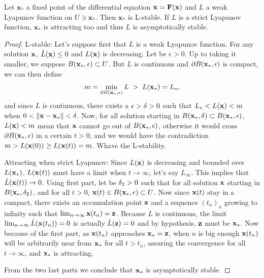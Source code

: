 \begin{theoreme} \label{th:Lyapunov}
Let $\mathbf{x}_*$ a fixed point of the differential equation $\dot{\mathbf{x}} = \mathbf{F}(\mathbf{x})$ and $L$ a weak Lyapunov function on $U\ni\mathbf{x}_*$. Then $\mathbf{x}_*$ is L-stable. If $L$ is a strict Lyapunov function, $\mathbf{x}_*$ is attracting too and thus $L$ is asymptotically stable.
\end{theoreme}
\begin{proof}
L-stable: Let's suppose first that $L$ is a weak Lyapunov function. For any solution $\mathbf{x}$, $\dot{L}(\mathbf{x}) \leq 0$ and $L(\mathbf{x})$ is decreasing. Let be $\epsilon>0$. Up to taking it smaller, we suppose $B(\mathbf{x}_*,\epsilon) \subset U$. But $L$ is continuous and $\partial B(\mathbf{x}_*,\epsilon)$ is compact, we can then define
\[m=\min_{\partial B(\mathbf{x}_*,\epsilon)}{L} \; > \; L(\mathbf{x}_*)=L_*,\]
and since $L$ is continuous, there exists a $\epsilon>\delta>0$ such that $L_*<L(\mathbf{x})<m$ when $0<\|\mathbf{x}-\mathbf{x}_*\|<\delta$. Now, for all solution starting in $ B(\mathbf{x}_*,\delta) \subset B(\mathbf{x}_*,\epsilon)$, $L(\mathbf{x})<m$ mean that $\mathbf{x}$ cannot go out of $B(\mathbf{x}_*,\epsilon)$, otherwise it would cross $\partial B(\mathbf{x}_*,\epsilon)$ in a certain $t>0$, and  we would have the contradiction $m>L(\mathbf{x}(0)) \geq L(\mathbf{x}(t))= m$. Whave the L-stability.

Attracting when strict Lyapunov: Since $L(\mathbf{x})$ is decreasing and bounded over $L(\mathbf{x}_*)$, $L(\mathbf{x}(t))$ must have a limit when $t\to\infty$, let's say $L_{\infty}$. This implies that $\dot{L}(\mathbf{x}(t)) \to 0$. Using first part, let be $\delta_2>0$ such that for all solution $\mathbf{x}$ starting in $B(\mathbf{x}_*,\delta_2)$, and for all $t>0$, $\mathbf{x}(t) \in B(\mathbf{x}_*,\epsilon)\subset U$. Now since $\mathbf{x}(t)$ stay in a compact, there exists an accumulation point $\mathbf{z}$ and a sequence $(t_n)_n$ growing to infinity such that $\lim_{n\to\infty} \mathbf{x}(t_n) = \mathbf{z}$. Because $\dot{L}$ is continuous, the limit $\lim_{n\to\infty} \dot{L}(\mathbf{x}(t_n)) =0$ is actually $\dot{L}(\mathbf{z})=0$ and by hypothesis, $\mathbf{z}$ must be $\mathbf{x}_*$. Now because of the first part, as $\mathbf{x}(t_n)$ approaches $\mathbf{x}_*=\mathbf{z}$, when $n$ is big enough $\mathbf{x}(t_n)$ will be arbitrarily near from $\mathbf{x}_*$ for all $t>t_n$, assuring the convergence for all $t\to\infty$, and $\mathbf{x}_*$ is attracting.

From the two last parts we conclude that $\mathbf{x}_*$ is asymptotically stable.
\end{proof}

